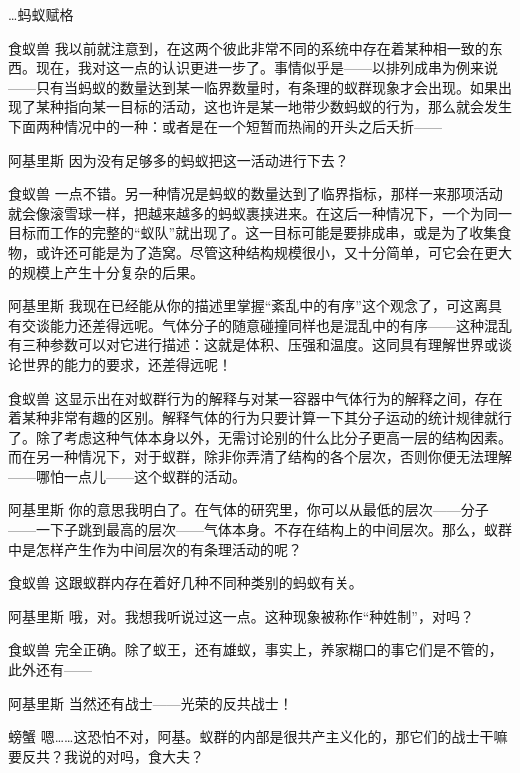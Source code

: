 \begin{dialog}{…蚂蚁赋格}
\begin{dialogue}
\item[食蚁兽]我以前就注意到，在这两个彼此非常不同的系统中存在着某种相一致的东西。现在，我对这一点的认识更进一步了。事情似乎是——以排列成串为例来说——只有当蚂蚁的数量达到某一临界数量时，有条理的蚁群现象才会出现。如果出现了某种指向某一目标的活动，这也许是某一地带少数蚂蚁的行为，那么就会发生下面两种情况中的一种：或者是在一个短暂而热闹的开头之后夭折——

\item[阿基里斯]因为没有足够多的蚂蚁把这一活动进行下去？

\item[食蚁兽]一点不错。另一种情况是蚂蚁的数量达到了临界指标，那样一来那项活动就会像滚雪球一样，把越来越多的蚂蚁裹挟进来。在这后一种情况下，一个为同一目标而工作的完整的“蚁队”就出现了。这一目标可能是要排成串，或是为了收集食物，或许还可能是为了造窝。尽管这种结构规模很小，又十分简单，可它会在更大的规模上产生十分复杂的后果。

\item[阿基里斯]我现在已经能从你的描述里掌握“紊乱中的有序”这个观念了，可这离具有交谈能力还差得远呢。气体分子的随意碰撞同样也是混乱中的有序——这种混乱有三种参数可以对它进行描述：这就是体积、压强和温度。这同具有理解世界或谈论世界的能力的要求，还差得远呢！

\item[食蚁兽]这显示出在对蚁群行为的解释与对某一容器中气体行为的解释之间，存在着某种非常有趣的区别。解释气体的行为只要计算一下其分子运动的统计规律就行了。除了考虑这种气体本身以外，无需讨论别的什么比分子更高一层的结构因素。而在另一种情况下，对于蚁群，除非你弄清了结构的各个层次，否则你便无法理解——哪怕一点儿——这个蚁群的活动。

\item[阿基里斯]你的意思我明白了。在气体的研究里，你可以从最低的层次——分子——一下子跳到最高的层次——气体本身。不存在结构上的中间层次。那么，蚁群中是怎样产生作为中间层次的有条理活动的呢？

\item[食蚁兽]这跟蚁群内存在着好几种不同种类别的蚂蚁有关。

\item[阿基里斯]哦，对。我想我听说过这一点。这种现象被称作“种姓制”，对吗？

\item[食蚁兽]完全正确。除了蚁王，还有雄蚁，事实上，养家糊口的事它们是不管的，此外还有——

\item[阿基里斯]当然还有战士——光荣的反共战士！

\item[螃蟹]嗯……这恐怕不对，阿基。蚁群的内部是很共产主义化的，那它们的战士干嘛要反共？我说的对吗，食大夫？


\end{dialogue}
\end{dialog}
